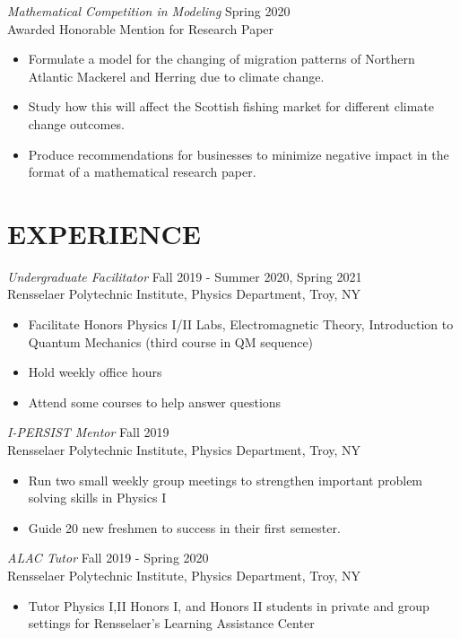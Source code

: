 \documentclass[margin]{rpires}
\begin{document}
\begin{resume}
    {\sl Mathematical Competition in Modeling} \hfill Spring 2020 \\
    Awarded Honorable Mention for Research Paper
    \begin{itemize}  \itemsep -2pt %
        \item Formulate a model for the changing of migration patterns of Northern Atlantic Mackerel and Herring due to climate change.
        \item Study how this will affect the Scottish fishing market for different climate change outcomes.
        \item Produce recommendations for businesses to minimize negative impact in the format of a mathematical research paper.
    \end{itemize}
\newpage
\section{EXPERIENCE}
    {\sl Undergraduate Facilitator} \hfill Fall 2019 - Summer 2020, Spring 2021 \\
    Rensselaer Polytechnic Institute, Physics Department, Troy, NY
    \begin{itemize}  \itemsep -2pt %
        \item Facilitate Honors Physics I/II Labs, Electromagnetic Theory, Introduction to Quantum Mechanics (third course in QM sequence)
        \item Hold weekly office hours
        \item Attend some courses to help answer questions
    \end{itemize}

    {\sl I-PERSIST Mentor} \hfill Fall 2019 \\
    Rensselaer Polytechnic Institute, Physics Department, Troy, NY
    \begin{itemize}  \itemsep -2pt %
        \item Run two small weekly group meetings to strengthen important problem solving skills in Physics I 
        \item Guide 20 new freshmen to success in their first semester.
    \end{itemize}

    {\sl ALAC Tutor} \hfill Fall 2019 - Spring 2020 \\
    Rensselaer Polytechnic Institute, Physics Department, Troy, NY
    \begin{itemize}  \itemsep -2pt %
        \item Tutor Physics I,II Honors I, and Honors II students in private and group settings for Rensselaer's Learning Assistance Center
    \end{itemize}


\end{resume}
\end{document}
